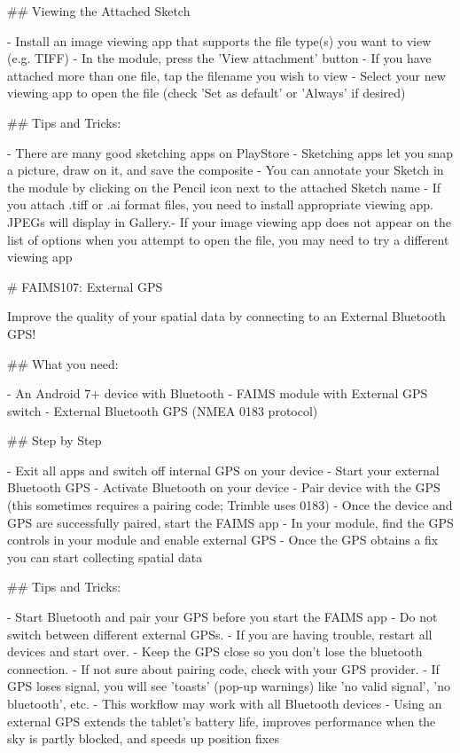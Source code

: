 ## Viewing the Attached Sketch

-  Install an image viewing app that supports the file type(s) you want to view (e.g. TIFF)
-  In the module, press the 'View attachment' button
-  If you have attached more than one file, tap the filename you wish to view
-  Select your new viewing app to open the file (check 'Set as default' or 'Always' if desired)


## Tips and Tricks:

-  There are many good sketching apps on PlayStore
-  Sketching apps let you snap a picture, draw on it, and save the composite
-  You can annotate your Sketch in the module by clicking on the Pencil icon next to the attached Sketch name
-  If you attach .tiff or .ai format files, you need to install appropriate viewing app. JPEGs will display in Gallery.-  If your image viewing app does not appear on the list of options when you attempt to open the file, you may need to try a different viewing app



# FAIMS107: External GPS

Improve the quality of your spatial data by connecting to an External Bluetooth GPS!

## What you need:

-  An Android 7+ device with Bluetooth
-  FAIMS module with External GPS switch
-  External Bluetooth GPS (NMEA 0183 protocol)



## Step by Step

-  Exit all apps and switch off internal GPS on your device
-  Start your external Bluetooth GPS
-  Activate Bluetooth on your device
-  Pair device with the GPS (this sometimes requires a pairing code; Trimble uses 0183)
-  Once the device and GPS are successfully paired, start the FAIMS app
-  In your module, find the GPS controls in your module and enable external GPS
-  Once the GPS obtains a fix you can start collecting spatial data




## Tips and Tricks:

-  Start Bluetooth and pair your GPS before you start the FAIMS app
-  Do not switch between different external GPSs. 
-  If you are having trouble, restart all devices and start over.
-  Keep the GPS close so you don’t lose the bluetooth connection.
-  If not sure about pairing code, check with your GPS provider.
-  If GPS loses signal, you will see 'toasts' (pop-up warnings) like 'no valid signal', 'no bluetooth', etc. 
-  This workflow may work with all Bluetooth devices
-  Using an external GPS extends the tablet’s battery life, improves performance when the sky is partly blocked, and speeds up position fixes






